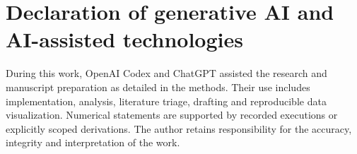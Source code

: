 \documentclass[preprint,12pt]{elsarticle}
\begin{document}
\section*{Declaration of generative AI and AI-assisted technologies}
During this work, OpenAI Codex and ChatGPT assisted the research and
manuscript preparation as detailed in the methods. Their use includes
implementation, analysis, literature triage, drafting and reproducible
data visualization. Numerical statements are supported by recorded executions
or explicitly scoped derivations. The author retains responsibility for
the accuracy, integrity and interpretation of the work.


\end{document}
